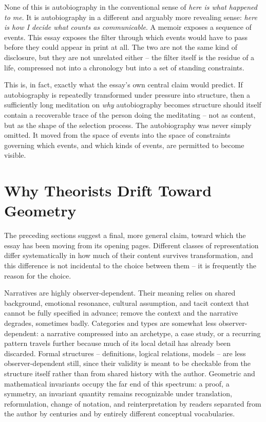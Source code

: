 \documentclass[11pt]{article}
\theoremstyle{plain}
\begin{document}
None of this is autobiography in the conventional sense of \emph{here is what happened to me}. It is autobiography in a different and arguably more revealing sense: \emph{here is how I decide what counts as communicable}. A memoir exposes a sequence of events. This essay exposes the filter through which events would have to pass before they could appear in print at all. The two are not the same kind of disclosure, but they are not unrelated either -- the filter itself is the residue of a life, compressed not into a chronology but into a set of standing constraints.

This is, in fact, exactly what the essay's own central claim would predict. If autobiography is repeatedly transformed under pressure into structure, then a sufficiently long meditation on \emph{why} autobiography becomes structure should itself contain a recoverable trace of the person doing the meditating -- not as content, but as the shape of the selection process. The autobiography was never simply omitted. It moved from the space of events into the space of constraints governing which events, and which kinds of events, are permitted to become visible.

\section{Why Theorists Drift Toward Geometry}

The preceding sections suggest a final, more general claim, toward which the essay has been moving from its opening pages. Different classes of representation differ systematically in how much of their content survives transformation, and this difference is not incidental to the choice between them -- it is frequently the reason for the choice.

Narratives are highly observer-dependent. Their meaning relies on shared background, emotional resonance, cultural assumption, and tacit context that cannot be fully specified in advance; remove the context and the narrative degrades, sometimes badly. Categories and types are somewhat less observer-dependent: a narrative compressed into an archetype, a case study, or a recurring pattern travels further because much of its local detail has already been discarded. Formal structures -- definitions, logical relations, models -- are less observer-dependent still, since their validity is meant to be checkable from the structure itself rather than from shared history with the author. Geometric and mathematical invariants occupy the far end of this spectrum: a proof, a symmetry, an invariant quantity remains recognizable under translation, reformulation, change of notation, and reinterpretation by readers separated from the author by centuries and by entirely different conceptual vocabularies.
\end{document}
